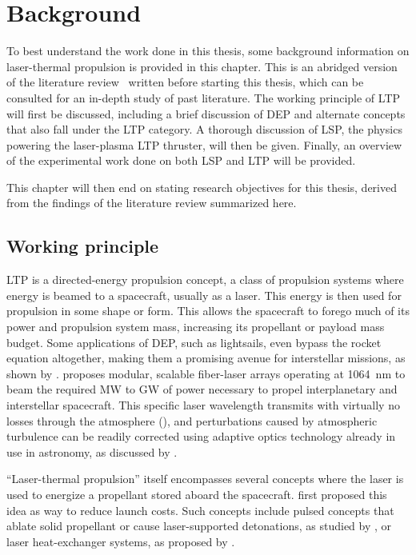 \chapter{Background}
    To best understand the work done in this thesis, some background information on laser-thermal propulsion is provided in this chapter. This is an abridged version of the literature review~\cite{duplayReviewLaserThermalPropulsion2022} written before starting this thesis, which can be consulted for an in-depth study of past literature. The working principle of LTP will first be discussed, including a brief discussion of DEP and alternate concepts that also fall under the LTP category. A thorough discussion of LSP, the physics powering the laser-plasma LTP thruster, will then be given. Finally, an overview of the experimental work done on both LSP and LTP will be provided.

    This chapter will then end on stating research objectives for this thesis, derived from the findings of the literature review summarized here.

    \section{Working principle}
        LTP is a directed-energy propulsion concept, a class of propulsion systems where energy is beamed to a spacecraft, usually as a laser. This energy is then used for propulsion in some shape or form. This allows the spacecraft to forego much of its power and propulsion system mass, increasing its propellant or payload mass budget. Some applications of DEP, such as lightsails, even bypass the rocket equation altogether, making them a promising avenue for interstellar missions, as shown by \textcite{lubinRoadmapInterstellarFlight2022}. \citeauthor{lubinRoadmapInterstellarFlight2022} proposes modular, scalable fiber-laser arrays operating at \qty{1064}{nm} to beam the required MW to GW of power necessary to propel interplanetary and interstellar spacecraft. This specific laser wavelength transmits with virtually no losses through the atmosphere (\textcite{geminiobservatorySites2020}), and perturbations caused by atmospheric turbulence can be readily corrected using adaptive optics technology already in use in astronomy, as discussed by \textcite{eckelLaserPropulsionSystems, hettelBeamPropagationSimulation2021}.

        ``Laser-thermal propulsion'' itself encompasses several concepts where the laser is used to energize a propellant stored aboard the spacecraft. \textcite{kantrowitzRelevanceSpace1971} first proposed this idea as way to reduce launch costs. Such concepts include pulsed concepts that ablate solid propellant or cause laser-supported detonations, as studied by \textcite{myraboPowerBeamingTechnologyLaser1984}, or laser heat-exchanger systems, as proposed by \textcite{kareLaserpoweredHeatExchanger1995}. 
        
